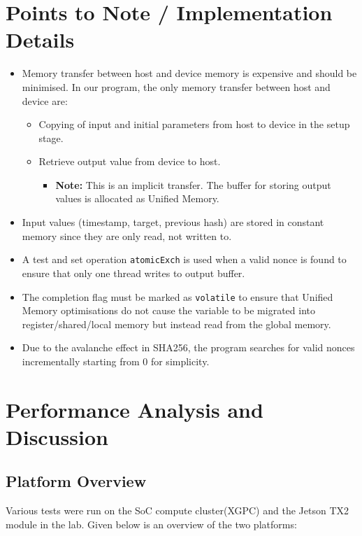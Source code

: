 \documentclass[a4paper,12pt]{article}
\begin{document}
\section{Points to Note / Implementation Details}
\begin{itemize}
	\item Memory transfer between host and device memory is expensive and should be minimised. In our program, the only memory transfer between host and device are:
  \begin{itemize}
    \item Copying of input and initial parameters from host to device in the setup stage.
    \item Retrieve output value from device to host.
    \begin{itemize}
      \item \textbf{Note:} This is an implicit transfer. The buffer for storing output values is allocated as Unified Memory.
    \end{itemize}
  \end{itemize}
  \item Input values (timestamp, target, previous hash) are stored in constant memory since they are only read, not written to.
  \item A test and set operation \texttt{atomicExch} is used when a valid nonce is found to ensure that only one thread writes to output buffer.
  \item The completion flag must be marked as \texttt{volatile} to ensure that Unified Memory optimisations do not cause the variable to be migrated into register/shared/local memory but instead read from the global memory.
  \item Due to the avalanche effect in SHA256, the program searches for valid nonces incrementally starting from 0 for simplicity.
\end{itemize}

\section{Performance Analysis and Discussion}

\subsection{Platform Overview}

Various tests were run on the SoC compute cluster(XGPC) and the Jetson TX2 module in the lab. Given below is an overview of the two platforms:
\end{document}

